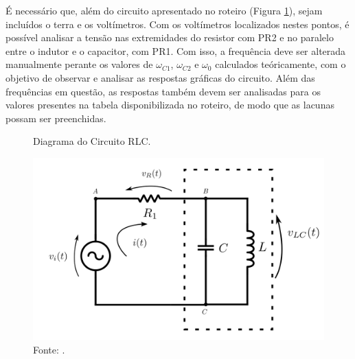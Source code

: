 É necessário que, além do circuito apresentado no roteiro (Figura \ref{circuitoRoteiro}), sejam incluídos o terra e os voltímetros. Com os voltímetros localizados nestes pontos, é possível analisar a tensão nas extremidades do resistor com PR2 e no paralelo entre o indutor e o capacitor, com PR1. Com isso, a frequência deve ser alterada manualmente perante os valores de $\omega_{C1}$, $\omega_{C2}$ e $\omega_0$ calculados teóricamente, com o objetivo de observar e analisar as respostas gráficas do circuito. Além das frequências em questão, as respostas também devem ser analisadas para os valores presentes na tabela disponibilizada no roteiro, de modo que as lacunas possam ser preenchidas.

\begin{figure}[H]
	\centering
	\caption{Diagrama do Circuito RLC.}
	\includegraphics[width=15cm]{images/circuitoRoteiro.png}
	\caption*{Fonte: \cite{roteiro4}.}
	\label{circuitoRoteiro}
\end{figure}

\pagebreak